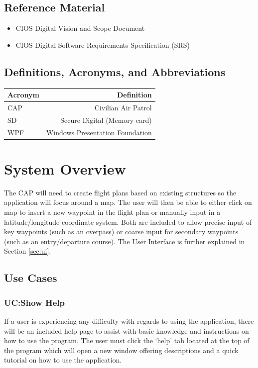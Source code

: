 \documentclass[12pt, letterpaper]{article}
\begin{document}
  \subsection{Reference Material}
    \begin{itemize}
      \setlength{\itemsep}{1pt}
      \setlength{\parskip}{0pt}
      \setlength{\parsep}{0pt}
      \item CIOS Digital Vision and Scope Document
      \item CIOS Digital Software Requirements Specification (SRS)
    \end{itemize}

\subsection{Definitions, Acronyms, and Abbreviations}
\begin{tabularx}{\textwidth}{|l|R|} \hline
  Acronym & Definition \\ \hline
  CAP & Civilian Air Patrol  \\ \hline
  SD & Secure Digital (Memory card) \\ \hline
  WPF & Windows Presentation Foundation \\ \hline
\end{tabularx}

\newpage
\section{System Overview}\label{system}
The CAP will need to create flight plans based on existing structures so the application will focus around a map.
The user will then be able to either click on map to insert a new waypoint in the flight plan or manually input in a latitude/longitude coordinate system.
Both are included to allow precise input of key waypoints (such as an overpass) or coarse input for secondary waypoints (such as an entry/departure course).
The User Interface is further explained in Section \ref{sec:ui}.

\subsection{Use Cases}

\subsubsection{UC:Show Help}
If a user is experiencing any difficulty with regards to using the application, there will be an included help page to assist with basic knowledge and instructions on how to use the program.
The user must click the `help' tab located at the top of the program which will open a new window offering descriptions and a quick tutorial on how to use the application.
\end{document}
